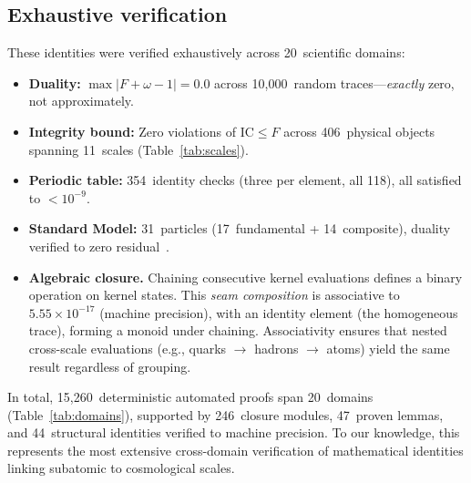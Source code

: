 \documentclass[11pt]{article}
\newcommand{\IC}{\mathrm{IC}}
\begin{document}
\subsection{Exhaustive verification}

These identities were verified exhaustively across
20~scientific domains:

\begin{itemize}[leftmargin=1.5em,itemsep=2pt]
\item \textbf{Duality:} $\max|F + \omega - 1| = 0.0$
  across 10{,}000~random traces---\emph{exactly} zero, not
  approximately.
\item \textbf{Integrity bound:} Zero violations of $\IC \leq F$
  across 406~physical objects spanning 11~scales
  (Table~\ref{tab:scales}).
\item \textbf{Periodic table:} 354~identity checks (three per
  element, all 118), all satisfied to $< 10^{-9}$.
\item \textbf{Standard Model:} 31~particles (17~fundamental +
  14~composite), duality verified to zero
  residual~\cite{pdg2024}.
\item \textbf{Algebraic closure.} Chaining consecutive kernel
  evaluations defines a binary operation on kernel states.
  This \emph{seam composition} is associative to
  $5.55 \times 10^{-17}$ (machine precision), with an identity
  element (the homogeneous trace), forming a
  monoid under chaining. Associativity ensures that nested
  cross-scale evaluations (e.g., quarks $\to$ hadrons $\to$ atoms)
  yield the same result regardless of grouping.
\end{itemize}

In total, 15{,}260~deterministic automated proofs span
20~domains (Table~\ref{tab:domains}), supported by
246~closure modules, 47~proven lemmas, and 44~structural
identities verified to machine precision. To our knowledge,
this represents the most extensive cross-domain verification
of mathematical identities linking subatomic to cosmological
scales.
\end{document}
